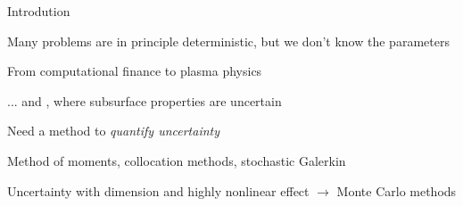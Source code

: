 \def\name{Introdution}
\begin{frame}{\name{}}
    \begin{squarelist}
        \item<1-> Many problems are in principle deterministic, but we don't know the parameters
        \begin{circlelist}
            \item From computational finance to plasma physics
            \item ... and , where subsurface properties are uncertain
        \end{circlelist}
        \item<2-> Need a method to \emph{quantify uncertainty}
        \begin{circlelist}
            \item Method of moments, collocation methods, stochastic Galerkin
            \item Uncertainty with dimension and highly nonlinear effect $\rightarrow$ Monte Carlo methods
        \end{circlelist}
        
            
    \end{squarelist}
\end{frame}